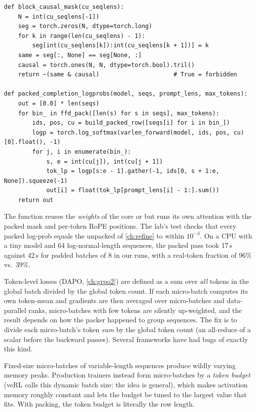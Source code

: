 \begin{lstlisting}[caption={Block-diagonal causal mask and a packed log-prob pass
(\texttt{llmsys/rlsys/packing.py}, abridged).},label={lst:rlsys:packing}]
def block_causal_mask(cu_seqlens):
    N = int(cu_seqlens[-1])
    seg = torch.zeros(N, dtype=torch.long)
    for k in range(len(cu_seqlens) - 1):
        seg[int(cu_seqlens[k]):int(cu_seqlens[k + 1])] = k
    same = seg[:, None] == seg[None, :]
    causal = torch.ones(N, N, dtype=torch.bool).tril()
    return ~(same & causal)                     # True = forbidden

def packed_completion_logprobs(model, seqs, prompt_lens, max_tokens):
    out = [0.0] * len(seqs)
    for bin_ in ffd_pack([len(s) for s in seqs], max_tokens):
        ids, pos, cu = build_packed_row([seqs[i] for i in bin_])
        logp = torch.log_softmax(varlen_forward(model, ids, pos, cu)[0].float(), -1)
        for j, i in enumerate(bin_):
            s, e = int(cu[j]), int(cu[j + 1])
            tok_lp = logp[s:e - 1].gather(-1, ids[0, s + 1:e, None]).squeeze(-1)
            out[i] = float(tok_lp[prompt_lens[i] - 1:].sum())
    return out
\end{lstlisting}

The function  reuses the \emph{weights} of the core
 or  but runs its own attention with the packed mask and
per-token RoPE positions. The lab's test checks that every packed log-prob equals the
unpacked  of \cref{ch:refine} to within $10^{-3}$. On a CPU with a tiny
model and 64 log-normal-length sequences, the packed pass took 17\,s against 42\,s for
padded batches of 8 in our runs, with a real-token fraction of 96\% vs.\ 39\%.

\begin{pitfall}
Token-level losses (DAPO, \cref{ch:grpo2}) are defined as a sum over \emph{all} tokens in the
global batch divided by the global token count. If each micro-batch computes its own
token-mean and gradients are then averaged over micro-batches and data-parallel ranks,
micro-batches with few tokens are silently up-weighted, and the result depends on how the
packer happened to group sequences. The fix is to divide each micro-batch's token \emph{sum} by
the global token count (an all-reduce of a scalar before the backward passes). Several
frameworks have had bugs of exactly this kind.
\end{pitfall}

\begin{systemslens}
Fixed-size micro-batches of variable-length sequences produce wildly varying memory peaks.
Production trainers instead form micro-batches by a \emph{token budget} (veRL calls this
dynamic batch size; the idea is general), which makes activation memory roughly constant and
lets the budget be tuned to the largest value that fits. With packing, the token budget is
literally the row length.
\end{systemslens}


